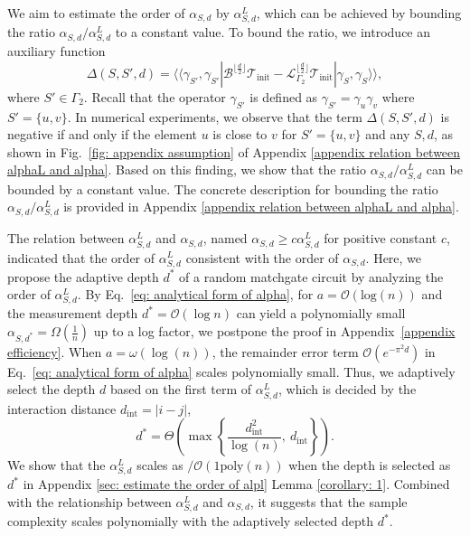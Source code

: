 \documentclass[showpacs,twocolumn,aps,prx,long bibliography,superscriptaddress,notitlepage]{revtex4-1}
\newcommand{\supket}[1]{|#1 \rangle\rangle}
\newcommand{\supbra}[1]{\langle\langle #1 |}
\newcommand{\cbra}[1]{\{ #1 \}}
\newcommand{\pbra}[1]{\left( #1 \right)}
\newcommand{\Tcal}{\mathcal{T}}
\begin{document}
We aim to estimate the order of $\alpha_{S,d}$ by $\alpha_{S,d}^L$, which can be achieved by bounding the ratio $\alpha_{S,d} /\alpha_{S,d}^L$ to a constant value. 
To bound the ratio, we introduce an auxiliary function
\begin{equation}
\label{eq: def del}
    \Delta(S,S',d) = \supbra{\gamma_{S' }, \gamma_{S'}} 
\mathcal{B}^{\lfloor \frac{d}{2}\rfloor} \Tcal_\text{init} -  \mathcal{L}_{\Gamma_2}^{\lfloor \frac{d}{2}\rfloor} \Tcal_\text{init} \supket{\gamma_S, \gamma_S},
\end{equation}
where $S'\in\Gamma_2$. 
Recall that the operator $\gamma_{S'}$ is defined as $\gamma_{S'} = \gamma_{u} \gamma_{v}$ where $S' = \cbra{u,v}$. 
In numerical experiments, we observe that the term $\Delta(S, S',d)$ is negative if and only if the element $u$ is close to $v$ for $S'=\cbra{u,v}$ and any $S,d$, as shown in Fig.~\ref{fig: appendix assumption} of Appendix \ref{appendix relation between alphaL and alpha}. Based on this finding, we show that the ratio $\alpha_{S,d} /\alpha_{S,d}^L$ can be bounded by a constant value. The concrete description for bounding the ratio $\alpha_{S,d} /\alpha_{S,d}^L$ is provided in Appendix \ref{appendix relation between alphaL and alpha}.


The relation between $\alpha^L_{S,d}$ and $\alpha_{S,d}$, named $\alpha_{S,d}\geq c\alpha^L_{S,d}$ for positive constant $c$, indicated that the order of $\alpha_{S,d}^L$ consistent with the order of $\alpha_{S,d}$. Here, we propose the adaptive depth $d^\ast$ of a random matchgate circuit by analyzing the order of $\alpha^L_{S,d}$. 
By Eq.~\eqref{eq: analytical form of alpha}, for $ a = \mathcal{O}(\mathrm{log}(n)) $ and the measurement depth $ d^\ast = \mathcal{O} (\log n)$ can yield a polynomially small $ \alpha_{S,d^*} = \Omega\left(\frac{1}{n} \right)$ up to a log factor, we postpone the proof in Appendix~\ref{appendix efficiency}. 
{When $a=\omega\pbra{\log(n)}$, the remainder error term $\mathcal{O}(e^{-\pi^2 d})$ in Eq.~\eqref{eq: analytical form of alpha} scales polynomially small. }
Thus, we adaptively select the depth $d$ based on the first term of $\alpha_{S,d}^L$, which is decided by the interaction distance $d_{\text{int}} = |i-j|$,
\begin{equation}
    d^\ast = \Theta\left( \max\left\{\frac{d_{\text{int}}^2}{\log(n)}, ~d_{\text{int}}  \right\} \right).
\end{equation}
We show that the $\alpha_{S,d}^L$ scales as $/\mathcal{O}(1\text{poly}(n))$ when the depth is selected as $d^\ast$ in Appendix \ref{sec: estimate the order of alpl} Lemma \ref{corollary: 1}. Combined with the relationship between $\alpha^L_{S,d}$ and $\alpha_{S,d}$, it suggests that the sample complexity scales polynomially with the adaptively selected depth $d^\ast$.
\end{document}
